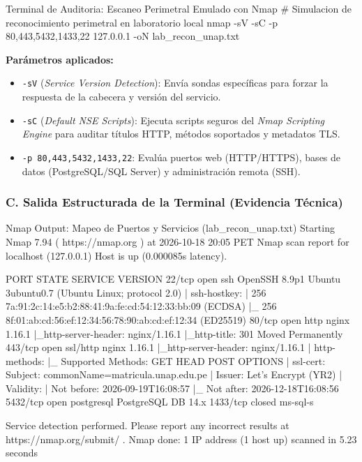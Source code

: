 \begin{cmdbox}{Terminal de Auditoria: Escaneo Perimetral Emulado con Nmap}
# Simulacion de reconocimiento perimetral en laboratorio local
nmap -sV -sC -p 80,443,5432,1433,22 127.0.0.1 -oN lab_recon_unap.txt
\end{cmdbox}

\textbf{Parámetros aplicados:}
\begin{itemize}
    \item \texttt{-sV} (\textit{Service Version Detection}): Envía sondas específicas para forzar la respuesta de la cabecera y versión del servicio.
    \item \texttt{-sC} (\textit{Default NSE Scripts}): Ejecuta scripts seguros del \textit{Nmap Scripting Engine} para auditar títulos HTTP, métodos soportados y metadatos TLS.
    \item \texttt{-p 80,443,5432,1433,22}: Evalúa puertos web (HTTP/HTTPS), bases de datos (PostgreSQL/SQL Server) y administración remota (SSH).
\end{itemize}

\newpage
\subsubsection*{C. Salida Estructurada de la Terminal (Evidencia Técnica)}

\begin{cmdbox}{Nmap Output: Mapeo de Puertos y Servicios (lab\_recon\_unap.txt)}
Starting Nmap 7.94 ( https://nmap.org ) at 2026-10-18 20:05 PET
Nmap scan report for localhost (127.0.0.1)
Host is up (0.000085s latency).

PORT     STATE  SERVICE     VERSION
22/tcp   open   ssh         OpenSSH 8.9p1 Ubuntu 3ubuntu0.7 (Ubuntu Linux; protocol 2.0)
| ssh-hostkey: 
|   256 7a:91:2c:14:e5:b2:88:41:9a:fe:cd:54:12:33:bb:09 (ECDSA)
|_  256 8f:01:ab:cd:56:ef:12:34:56:78:90:ab:cd:ef:12:34 (ED25519)
80/tcp   open   http        nginx 1.16.1
|_http-server-header: nginx/1.16.1
|_http-title: 301 Moved Permanently
443/tcp  open   ssl/http    nginx 1.16.1
|_http-server-header: nginx/1.16.1
| http-methods: 
|_  Supported Methods: GET HEAD POST OPTIONS
| ssl-cert: Subject: commonName=matricula.unap.edu.pe
| Issuer: Let's Encrypt (YR2)
| Validity: 
|   Not before: 2026-09-19T16:08:57
|_  Not after:  2026-12-18T16:08:56
5432/tcp open   postgresql  PostgreSQL DB 14.x
1433/tcp closed ms-sql-s

Service detection performed. Please report any incorrect results at https://nmap.org/submit/ .
Nmap done: 1 IP address (1 host up) scanned in 5.23 seconds
\end{cmdbox}

